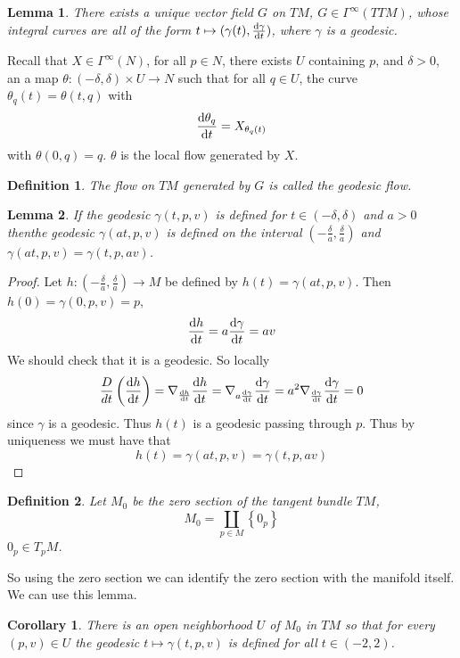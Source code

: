 \documentclass[a4paper]{article}
\newtheorem*{defn}{Definition}
\newtheorem*{cor}{Corollary}
\newtheorem*{lem}{Lemma}
\begin{document}
\begin{lem}
  There exists a unique vector field $G$ on $TM$, $G \in \Gamma^{\infty}(TTM)$, whose integral curves are all of the form $t \mapsto (\gamma(t), \dv{\gamma}{t}(t))$, where $\gamma$ is a geodesic.
\end{lem}

Recall that $X \in \Gamma^{\infty}(N)$, for all $p \in N$, there exists $U$ containing $p$, and $\delta >0$, an a map $\theta: (-\delta, \delta) \times U \rightarrow N$ such that for all $q \in U$, the curve $\theta_{q}(t) = \theta(t,q)$ with 
\[
  \dv{\theta_q}{t} = X_{\theta_q(t)}
\]
with $\theta(0,q) = q$. $\theta$ is the local flow generated by $X$.

\begin{defn}
  The flow on $TM$ generated by $G$ is called the geodesic flow.
\end{defn}

\begin{lem}
  If the geodesic $\gamma(t,p,v)$ is defined for $t \in (-\delta, \delta)$ and $a > 0$ thenthe geodesic $\gamma(at, p,v)$ is defined on the interval $(-\frac{\delta}{a}, \frac{\delta}{a})$ and $\gamma(a t, p, v) = \gamma(t, p, av)$.
\end{lem}

\begin{proof}
  Let $h : (-\frac{\delta}{a}, \frac{\delta}{a}) \rightarrow M$ be defined by $h(t) = \gamma(at, p, v)$. Then $h(0) = \gamma(0, p,v) = p$, 
  \[
    \dv{h}{t}(0) =  a \dv{\gamma}{t} (at, p, v) = av
  \]
  We should check that it is a geodesic. So locally
  \[
    \frac{D}{dt} \left(\dv{h}{t}\right) = \nabla_{\dv{h}{t}} \dv{h}{t} =  \nabla_{a \dv{\gamma}{t}} \dv{\gamma}{t} = a^2 \nabla_{\dv{\gamma}{t}} \dv{\gamma}{t} = 0
  \]
  since $\gamma$ is a geodesic. Thus $h(t)$ is a geodesic passing through $p$. Thus by uniqueness we must have that
  \[
    h(t) = \gamma(at, p, v) = \gamma(t, p, av)
  \]
\end{proof}

\begin{defn}
  Let $M_0$ be the zero section of the tangent bundle $TM$, 
  \[
    M_0 = \coprod_{p \in M} \left\{ 0_p \right\}
  \]
  $0_p \in T_pM$.
\end{defn}

So using the zero section we can identify the zero section with the manifold itself. We can use this lemma.

\begin{cor}
  There is an open neighborhood $U$ of $M_0$ in $TM$ so that for every $(p,v) \in U$ the geodesic $t \mapsto \gamma(t,p,v)$ is defined for all $t \in (-2,2)$.
\end{cor}
\end{document}

